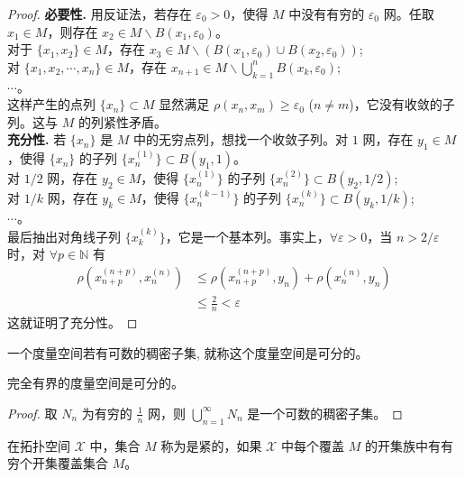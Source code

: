 \documentclass[lang=cn,newtx,10pt,scheme=chinese,thmcnt=chapter]{elegantbook}
\begin{document}
\begin{proof}
\textbf{必要性.} 用反证法，若存在 \( \varepsilon_0 > 0 \)，使得 \( M \) 中没有有穷的 \( \varepsilon_0 \) 网。任取 \( x_1 \in M \)，则存在 \( x_2 \in M \backslash B(x_1, \varepsilon_0) \)。\\
对于 \( \{x_1, x_2\} \in M \)，存在 \( x_3 \in M \backslash \left(B(x_1, \varepsilon_0) \cup B(x_2, \varepsilon_0)\right) \); \\
对 \( \{x_1, x_2, \cdots, x_n\} \in M \)，存在 \( x_{n+1} \in M \backslash \bigcup_{k=1}^n B(x_k, \varepsilon_0) \); \\
\(\cdots\)。\\这样产生的点列 \( \{x_n\} \subset M \) 显然满足 \( \rho(x_n, x_m) \geqslant \varepsilon_0 \) (\( n \neq m \))，它没有收敛的子列。这与 \( M \) 的列紧性矛盾。\\
\textbf{充分性.} 若 \( \{x_n\} \) 是 \( M \) 中的无穷点列，想找一个收敛子列。对 \( 1 \) 网，存在 \( y_1 \in M \)，使得 \( \{x_n\} \) 的子列 \( \{x_n^{(1)}\} \subset B(y_1, 1) \)。\\
对 \( 1/2 \) 网，存在 \( y_2 \in M \)，使得 \( \{x_n^{(1)}\} \) 的子列 \( \{x_n^{(2)}\} \subset B(y_2, 1/2) \); \\
对 \( 1/k \) 网，存在 \( y_k \in M \)，使得 \( \{x_n^{(k-1)}\} \) 的子列 \( \{x_n^{(k)}\} \subset B(y_k, 1/k) \); \\
\(\cdots\)。\\
最后抽出对角线子列 \( \{x_k^{(k)}\} \)，它是一个基本列。事实上，\( \forall \varepsilon > 0 \)，当 \( n > 2/\varepsilon \) 时，对 \( \forall p \in \mathbb{N} \) 有
\[
\begin{aligned}
\rho(x_{n+p}^{(n+p)}, x_n^{(n)}) &\leqslant \rho(x_{n+p}^{(n+p)}, y_n) + \rho(x_n^{(n)}, y_n) \\
&\leqslant \frac{2}{n} < \varepsilon
\end{aligned}
\]
这就证明了充分性。
\end{proof}
\begin{definition}[可分]
一个度量空间若有可数的稠密子集, 就称这个度量空间是可分的。
\end{definition}

\begin{theorem}
完全有界的度量空间是可分的。
\end{theorem}
\begin{proof}
取 \( N_n \) 为有穷的 \( \frac{1}{n} \) 网，则 \( \bigcup_{n=1}^{\infty} N_n \) 是一个可数的稠密子集。
\end{proof}

\begin{definition}[紧集]
在拓扑空间 \( \mathscr{X} \) 中，集合 \( M \) 称为是紧的，如果 \( \mathscr{X} \) 中每个覆盖 \( M \) 的开集族中有有穷个开集覆盖集合 \( M \)。
\end{definition}
\end{document}
